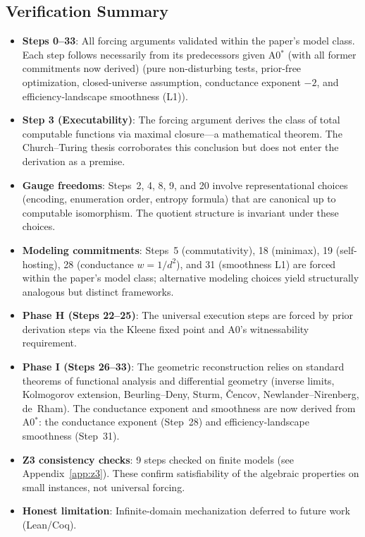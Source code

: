 
\subsection{Verification Summary}

\begin{itemize}[nosep]
  \item \textbf{Steps 0--33}: All forcing arguments validated within the
        paper's model class.  Each step follows necessarily from its
        predecessors given A0$^*$ (with all former commitments now derived) (pure
        non-disturbing tests, prior-free optimization, closed-universe
        assumption, conductance exponent $-2$, and efficiency-landscape
        smoothness (L1)).
  \item \textbf{Step 3 (Executability)}: The forcing argument derives the
        class of total computable functions via maximal closure---a
        mathematical theorem.  The Church--Turing thesis corroborates this
        conclusion but does not enter the derivation as a premise.
  \item \textbf{Gauge freedoms}: Steps~2, 4, 8, 9, and 20 involve
        representational choices (encoding, enumeration order, entropy
        formula) that are canonical up to computable isomorphism.  The
        quotient structure is invariant under these choices.
  \item \textbf{Modeling commitments}: Steps~5 (commutativity), 18
        (minimax), 19 (self-hosting), 28 (conductance $w = 1/d^2$), and
        31 (smoothness L1) are forced within the paper's model class;
        alternative modeling choices yield structurally analogous but
        distinct frameworks.
  \item \textbf{Phase H (Steps 22--25)}: The universal execution steps
        are forced by prior derivation steps via the Kleene fixed point
        and A0's witnessability requirement.
  \item \textbf{Phase I (Steps 26--33)}: The geometric reconstruction
        relies on standard theorems of functional analysis and
        differential geometry (inverse limits, Kolmogorov extension,
        Beurling--Deny, Sturm, \v{C}encov, Newlander--Nirenberg,
        de~Rham).  The conductance exponent and smoothness are now derived from A0$^*$: the
        conductance exponent (Step~28) and efficiency-landscape
        smoothness (Step~31).
  \item \textbf{Z3 consistency checks}: 9 steps checked on finite models
        (see Appendix~\ref{app:z3}).  These confirm satisfiability of the
        algebraic properties on small instances, not universal forcing.
  \item \textbf{Honest limitation}: Infinite-domain mechanization
        deferred to future work (Lean/Coq).
\end{itemize}
